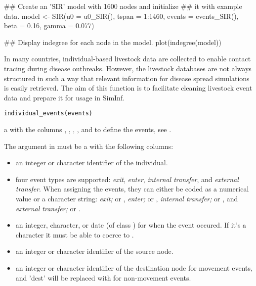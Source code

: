 \documentclass[letterpaper]{book}
\begin{document}
%
\begin{Examples}
\begin{ExampleCode}
## Create an 'SIR' model with 1600 nodes and initialize
## it with example data.
model <- SIR(u0 = u0_SIR(), tspan = 1:1460, events = events_SIR(),
             beta   = 0.16, gamma  = 0.077)

## Display indegree for each node in the model.
plot(indegree(model))
\end{ExampleCode}
\end{Examples}
%
\begin{Description}
In many countries, individual-based livestock data are collected
to enable contact tracing during disease outbreaks. However, the
livestock databases are not always structured in such a way that
relevant information for disease spread simulations is easily
retrieved. The aim of this function is to facilitate cleaning
livestock event data and prepare it for usage in SimInf.
\end{Description}
%
\begin{Usage}
\begin{verbatim}
individual_events(events)
\end{verbatim}
\end{Usage}
%
\begin{Arguments}
\begin{ldescription}
\item[\code{events}] a  with the columns , ,
, , and  to define the events, see
.
\end{ldescription}
\end{Arguments}
%
\begin{Details}
The argument  in  must be a
 with the following columns:
\begin{itemize}

\item{}  an integer or character identifier of the individual.
\item{}  four event types are supported: \emph{exit},
\emph{enter}, \emph{internal transfer}, and \emph{external
transfer}.  When assigning the events, they can either be
coded as a numerical value or a character string: \emph{exit;}
 or , \emph{enter;}  or
, \emph{internal transfer;}  or
, and \emph{external transfer;}  or
.
\item{}  an integer, character, or date (of class )
for when the event occured. If it's a character it must be
able to coerce to .
\item{}  an integer or character identifier of the source node.
\item{}  an integer or character identifier of the destination
node for movement events, and 'dest' will be replaced with
 for non-movement events.

\end{itemize}

\end{Details}
\end{document}
